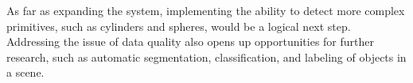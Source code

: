 As far as expanding the system, implementing the ability to detect more complex primitives,
such as cylinders and spheres, would be a logical next step.
Addressing the issue of data quality also opens up opportunities for further research, such as automatic segmentation,
classification, and labeling of objects in a scene.




%
%

